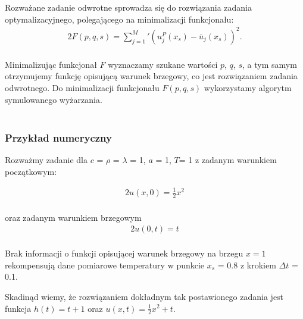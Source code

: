 \documentclass[twoside]{projektInzynierskiMS1}
\newcounter{rowcnt}
\newcommand\rownum{\ifnumequal{\value{rowcnt}}{0}{\textbf{Nr.}}{\therowcnt.}\refstepcounter{rowcnt}}
\newcommand{\newLine}{~\\}
\newcommand{\si}{ś}
\begin{document}
Rozważane zadanie odwrotne sprowadza się do rozwiązania zadania optymalizacyjnego, polegającego na minimalizacji funkcjonału:
\begin{alignat*}{2}
F(p, q, s) = \sum_{j=1}^M\prime \left(u^P_j (x_s) - \overline u_j (x_s)\right)^2.\\
\end{alignat*}

Minimalizując funkcjonał $F$ wyznaczamy szukane wartości $p$, $q$, $s$, a tym samym otrzymujemy funkcję opisującą warunek brzegowy, co jest rozwiązaniem zadania odwrotnego.
Do minimalizacji funkcjonału $F(p, q, s)$ wykorzystamy algorytm symulowanego wyżarzania. \\ \newLine


\subsubsection{Przykład numeryczny}

Rozważmy zadanie dla $c$ = $\rho$ = $\lambda$ = 1, $a$ = 1, $T$= 1 z zadanym warunkiem początkowym:

\begin{alignat*}{2}
u(x, 0) = \frac{1}{2} x^2\\
\end{alignat*}

oraz zadanym warunkiem brzegowym
\begin{alignat*}{2}
u(0, t) = t\\
\end{alignat*}


Brak informacji o funkcji opisującej warunek brzegowy na brzegu $x = 1$ rekompensują dane pomiarowe temperatury w punkcie $x_s$ = 0.8 z krokiem $\Delta t$ = 0.1.

Skadinąd wiemy, że rozwiązaniem dokładnym tak postawionego zadania jest funkcja $h(t) = t+1$ oraz $u(x, t) = \frac{1}{2}x^2 +t$.


\end{document}
